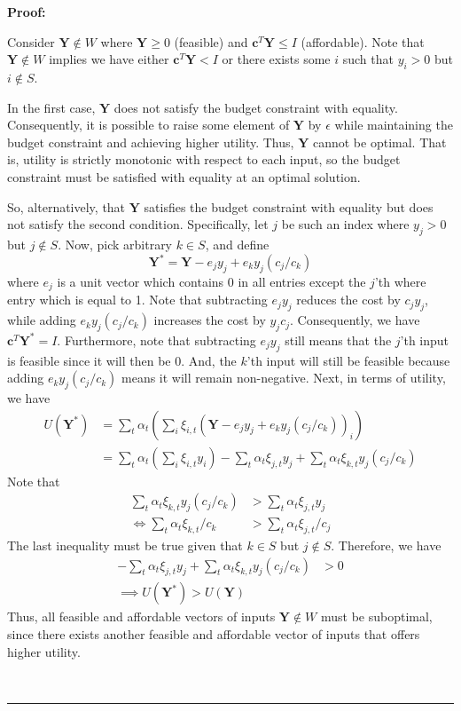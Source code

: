 \documentclass[11pt,a4paper,leqno]{extarticle}
\newenvironment{proof}[1][Proof]{\noindent\textbf{#1:} }{\ \rule{0.5em}{0.5em}}
\begin{document}
	\begin{proof}
		
		Consider $\mathbf{Y} \not\in W$ where $\mathbf{Y} \geq 0$ (feasible) and $\mathbf{c}^T  \mathbf{Y} \leq  I$ (affordable).	Note that $\mathbf{Y} \not\in W$ implies we have either $\mathbf{c}^T \mathbf{Y} < I$ or there exists some $i$ such that $y_i > 0$ but $i \not\in S$. 
		
		In the first case, $\mathbf{Y}$ does not satisfy the budget constraint with equality. Consequently, it is possible to raise some element of $\mathbf{Y}$ by $\epsilon$ while maintaining the budget constraint and achieving higher utility. Thus, $\mathbf{Y}$ cannot be optimal. That is, utility is strictly monotonic with respect to each input, so the budget constraint must be satisfied with equality at an optimal solution. 
		
		So, alternatively, that $\mathbf{Y}$ satisfies the budget constraint with equality but does not satisfy the second condition. Specifically, let $j$ be such an index where $y_j > 0$ but $j \not\in S$. Now, pick arbitrary $k \in S$, and define 
		$$ \mathbf{Y}^* =  \mathbf{Y} - e_j y_j  + e_k y_j (c_j/c_k)$$
		where $e_j$ is a unit vector which contains 0 in all entries except the $j$'th where entry which is equal to 1. Note that subtracting   $e_j y_j$ reduces the cost by $c_j y_j$, while adding $ e_k y_j (c_j/c_k)$ increases the cost by $y_j c_j$. Consequently, we have $ \mathbf{c}^T \mathbf{Y}^* = I$. Furthermore, note that subtracting $e_j y_j$ still means that the $j$'th input is feasible since it will then be 0. And, the $k$'th input will still be feasible because adding $ e_k y_j (c_j/c_k)$ means it will remain non-negative. Next, in terms of utility, we have
		\begin{align*}
			U(\mathbf{Y}^*) &= \sum_t \alpha_t \left( \sum_i  \xi_{i,t} ( \mathbf{Y} - e_j y_j  + e_k y_j (c_j/c_k) )_i  \right) \\
			&= \sum_t \alpha_t \left( \sum_i  \xi_{i,t} y_i \right) - \sum_t \alpha_t   \xi_{j,t} y_j   + \sum_t \alpha_t  \xi_{k,t} y_j (c_j/c_k)   
		\end{align*}
		Note that 
		\begin{align*}
			\sum_t \alpha_t  \xi_{k,t} y_j (c_j/c_k) &> \sum_t \alpha_t   \xi_{j,t} y_j \\
			\iff 	\sum_t \alpha_t  \xi_{k,t} /c_k &> \sum_t \alpha_t   \xi_{j,t}  /c_j 
		\end{align*}
		The last inequality must be true given that $k \in S$ but $j \not\in S$. Therefore, we have 
		\begin{align*}
		- \sum_t \alpha_t   \xi_{j,t} y_j   + \sum_t \alpha_t  \xi_{k,t} y_j (c_j/c_k)  &> 0 \\
		\implies 	U(\mathbf{Y}^*) > U(\mathbf{Y})
		\end{align*}
		Thus,  all feasible and affordable vectors of inputs $\mathbf{Y} \not\in W$ must be  suboptimal, since there exists another feasible and affordable vector of inputs that offers higher utility. 
		

\end{proof}
\end{document}
